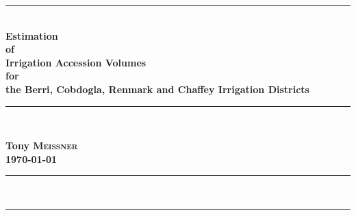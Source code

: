 \documentclass[a4paper, titlepage, 12pt]{article}\usepackage[]{graphicx}\usepackage[]{color}
\newcommand{\HRule}{\rule{\linewidth}{3.0mm}}
\begin{document}
\begin{sffamily}



\begin{titlepage}
\begin{center}

\color{blue}
\HRule \\ [0.5cm]
\color{black}
{ \huge \bfseries Estimation\\of\\Irrigation Accession Volumes\\for\\the Berri, Cobdogla, Renmark and Chaffey Irrigation Districts\\ [0.5cm]}
\color{green}
\HRule \\ [3.0cm]
\color{black}

\begin{center} \Large
\textbf{Tony \textsc{Meissner}} \\ [0.5cm]
{\large \textbf{\today}}
\end{center}

\color{white}
\HRule \\ [2.0cm]
\color{blue}
\begin{flushright}
\end{flushright}
\color{brown}
\HRule \\
\color{black}
\end{center}
\end{titlepage}




\end{sffamily}
\end{document}
